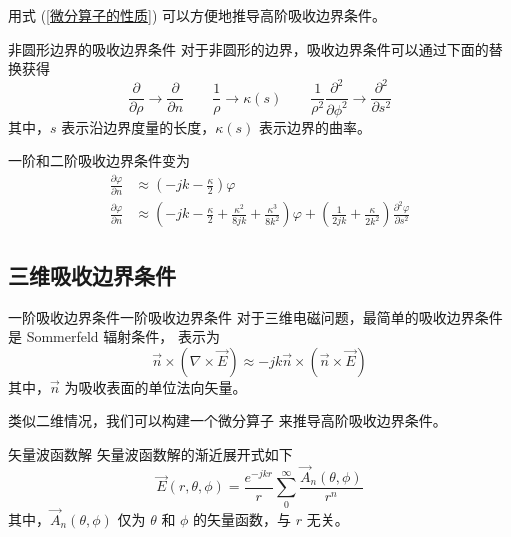 \par 用式 (\ref{微分算子的性质}) 可以方便地推导高阶吸收边界条件。

\begin{theorem}{非圆形边界的吸收边界条件}
    对于非圆形的边界，吸收边界条件可以通过下面的替换获得
    \begin{equation}
        \frac{\partial}{\partial \rho}
        \rightarrow
        \frac{\partial}{\partial n}
        \qquad
        \frac{1}{\rho}
        \rightarrow
        \kappa(s)
        \qquad
        \frac{1}{\rho^2}
        \frac{\partial^2}{\partial \phi^2}  
        \rightarrow
        \frac{\partial^2}{\partial s^2}
    \end{equation}
    其中，$s$ 表示沿边界度量的长度，$\kappa(s)$ 表示边界的曲率。

    一阶和二阶吸收边界条件变为
    \begin{align}
        \frac{\partial \varphi}{\partial n}
        &\approx
        \left(
            -jk-\frac{\kappa}{2}
        \right)\varphi\\
        \frac{\partial \varphi}{\partial n}
        &\approx
        \left(
            -jk-\frac{\kappa}{2}
            +\frac{\kappa^2}{8jk}
            +\frac{\kappa^3}{8k^2}
        \right)\varphi
        +\left(
            \frac{1}{2jk}
            +\frac{\kappa}{2k^2}
        \right)\frac{\partial^2 \varphi}{\partial s^2}
    \end{align}
\end{theorem}

\subsection{三维吸收边界条件}

\begin{theorem}{一阶吸收边界条件}{一阶吸收边界条件}
    对于三维电磁问题，最简单的吸收边界条件是 Sommerfeld 辐射条件，
    表示为
    \begin{equation}
        \vec{n}\times(\nabla\times\vec{E})
        \approx
        -jk\vec{n}\times(\vec{n}\times\vec{E})
    \end{equation}
    其中，$\vec{n}$ 为吸收表面的单位法向矢量。
\end{theorem}

\par 类似二维情况，我们可以构建一个微分算子
来推导高阶吸收边界条件。

\begin{theorem}{矢量波函数解}
    矢量波函数解的渐近展开式如下
    \begin{equation}
        \vec{E}(r,\theta,\phi)=
        \frac{e^{-jkr}}{r}
        \sum_{0}^{\infty}
        \frac{\vec{A}_n(\theta,\phi)}{r^n}
        \label{矢量波函数解}
    \end{equation}
    其中，$\vec{A}_n(\theta,\phi)$
    仅为 $\theta$ 和 $\phi$ 的矢量函数，与 $r$ 无关。
\end{theorem}

